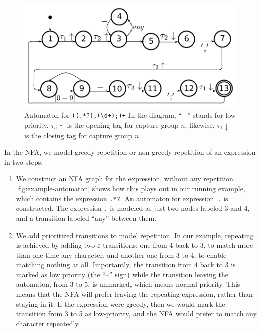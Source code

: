 \documentclass[11pt]{Thesis}
\theoremstyle{definition}
\begin{document}
\begin{figure}[htp]
\includegraphics[width=\linewidth]{graphs/lehrer_automaton}

\caption{\label{fig:example-automaton}
Automaton for \texttt{((.*?),(\textbackslash{}d+);)+} 
In the diagram, ``$-$'' stands for low priority. $\tau_n\uparrow$ is the
opening tag for capture group $n$, likewise, $\tau_1\downarrow$ is the closing
tag for capture group $n$.}
\end{figure}


In the NFA, we model greedy repetition or non-greedy repetition of
an expression in two steps:

\begin{enumerate}
\item We construct an NFA graph for the expression, without any
repetition.  \autoref{fig:example-automaton} shows how this plays
out in our running example, which contains the expression \texttt{.*?}.
An automaton for expression~\texttt{.} is constructed. The expression
\texttt{.} is modeled as just two nodes labeled 3 and 4, and a
transition labeled ``any'' between them.

\item We add prioritized transitions to model repetition. In our
example, repeating is achieved by adding two $\varepsilon$ transitions:
one from 4 back to 3, to match more than one time any character,
and another one from 3 to 4, to enable matching nothing at all.
Importantly, the transition from 4 back to 3 is marked as low
priority (the ``--'' sign) while the transition leaving the automaton,
from 3 to 5, is unmarked, which means normal priority.  This means
that the NFA will prefer leaving the repeating expression, rather
than staying in it.  If the expression were greedy, then we would
mark the transition from 3 to 5 as low-priority, and the NFA would
prefer to match any character repeatedly.

\end{enumerate}
\end{document}

